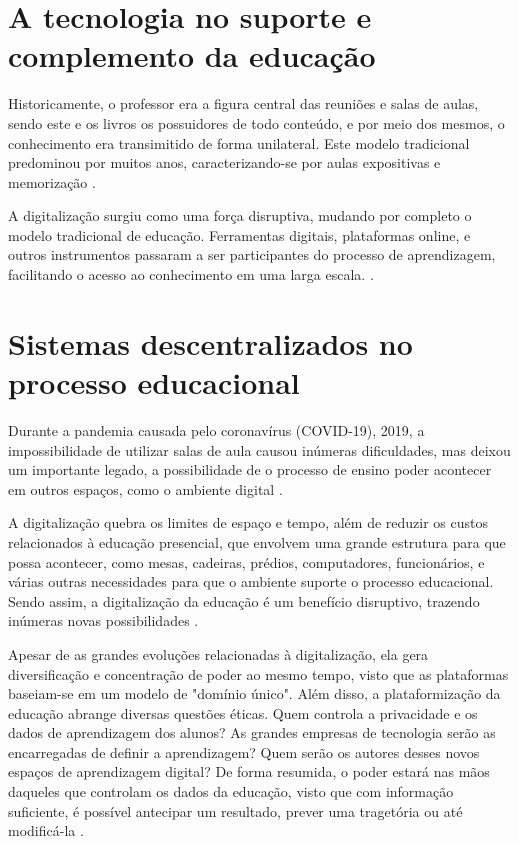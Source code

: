 \section{A tecnologia no suporte e complemento da educação}
Historicamente, o professor era a figura central das reuniões e salas de aulas, sendo este e os livros os possuidores de todo conteúdo, e por meio dos mesmos, o conhecimento era transimitido de forma unilateral. Este modelo tradicional predominou por muitos anos, caracterizando-se por aulas expositivas e memorização \cite{unicep2024}.

A digitalização surgiu como uma força disruptiva, mudando por completo o modelo tradicional de educação. Ferramentas digitais, plataformas online, e outros instrumentos passaram a ser participantes do processo de aprendizagem, facilitando o acesso ao conhecimento em uma larga escala. \cite{unicep2024}.

\section{Sistemas descentralizados no processo educacional}
Durante a pandemia causada pelo coronavírus (COVID-19), 2019, a impossibilidade de utilizar salas de aula causou inúmeras dificuldades, mas deixou um importante legado, a possibilidade de o processo de ensino poder acontecer em outros espaços, como o ambiente digital \cite{valente2022}.

A digitalização quebra os limites de espaço e tempo, além de reduzir os custos relacionados à educação presencial, que envolvem uma grande estrutura para que possa acontecer, como mesas, cadeiras, prédios, computadores, funcionários, e várias outras necessidades para que o ambiente suporte o processo educacional. Sendo assim, a digitalização da educação é um benefício disruptivo, trazendo inúmeras novas possibilidades \cite{valente2022}.

Apesar de as grandes evoluções relacionadas à digitalização, ela gera diversificação e concentração de poder ao mesmo tempo, visto que as plataformas baseiam-se em um modelo de "domínio único". Além disso, a plataformização da educação abrange diversas questões éticas. Quem controla a privacidade e os dados de aprendizagem dos alunos? As grandes empresas de tecnologia serão as encarregadas de definir a aprendizagem? Quem serão os autores desses novos espaços de aprendizagem digital? De forma resumida, o poder estará nas mãos daqueles que controlam os dados da educação, visto que com informação suficiente, é possível antecipar um resultado, prever uma tragetória ou até modificá-la \cite{valente2022}.

